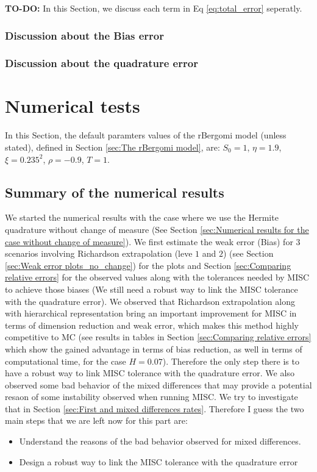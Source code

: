 \documentclass[11pt]{article}
\begin{document}
\textbf{TO-DO:} In this Section, we discuss each term in Eq \ref{eq:total_error} seperatly.
\subsubsection{Discussion about the Bias error}
\subsubsection{Discussion about the quadrature error}

\section{Numerical tests}\label{sec:Numerical tests}
In this Section, the default paramters values of the rBergomi model  (unless stated), defined in Section \ref{sec:The rBergomi model}, are: $S_0=1$, $\eta=1.9$, $\xi=0.235^2$, $\rho=-0.9$, $T=1$. 

\subsection{Summary of the numerical results}

We started the numerical results with the case where we use the Hermite quadrature without change of measure (See Section \ref{sec:Numerical results for the case without change of measure}). We first estimate the weak error (Bias) for $3$ scenarios involving Richardson extrapolation (leve $1$ and $2$) (see Section \ref{sec:Weak error plots_no_change}) for the plots and Section \ref{sec:Comparing relative errors} for the observed values along with the tolerances needed by MISC to achieve those biases (We still need a robust way to link the MISC tolerance with the quadrature error).  We observed that Richardson extrapolation along with hierarchical representation bring an important improvement for MISC in terms of dimension reduction and weak error, which makes this method highly competitive to MC (see results in tables in Section \ref{sec:Comparing relative errors} which show the gained advantage in terms of bias reduction, as well in terms of computational time, for the case $H=0.07$). Therefore the only step there is to have a robust way to link MISC tolerance with the quadrature error. We also observed some bad behavior of the mixed differences that may provide a potential resaon of some instability observed when running MISC. We try to investigate that in Section \ref{sec:First and mixed differences rates}. Therefore I guess the two main steps that we are left now for this part are:
\begin{itemize}
	\item Understand the reasons of the bad behavior observed for mixed differences.
	\item Design a robust way to link the MISC tolerance with the quadrature error
\end{itemize}
\end{document}
